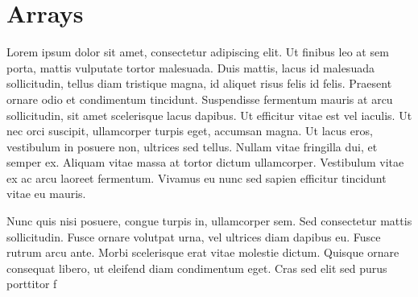\section{Arrays}
Lorem ipsum dolor sit amet, consectetur adipiscing elit. Ut finibus leo at sem porta, mattis vulputate tortor malesuada. Duis mattis, lacus id malesuada sollicitudin, tellus diam tristique magna, id aliquet risus felis id felis. Praesent ornare odio et condimentum tincidunt. Suspendisse fermentum mauris at arcu sollicitudin, sit amet scelerisque lacus dapibus. Ut efficitur vitae est vel iaculis. Ut nec orci suscipit, ullamcorper turpis eget, accumsan magna. Ut lacus eros, vestibulum in posuere non, ultrices sed tellus. Nullam vitae fringilla dui, et semper ex. Aliquam vitae massa at tortor dictum ullamcorper. Vestibulum vitae ex ac arcu laoreet fermentum. Vivamus eu nunc sed sapien efficitur tincidunt vitae eu mauris.

Nunc quis nisi posuere, congue turpis in, ullamcorper sem. Sed consectetur mattis sollicitudin. Fusce ornare volutpat urna, vel ultrices diam dapibus eu. Fusce rutrum arcu ante. Morbi scelerisque erat vitae molestie dictum. Quisque ornare consequat libero, ut eleifend diam condimentum eget. Cras sed elit sed purus porttitor f
